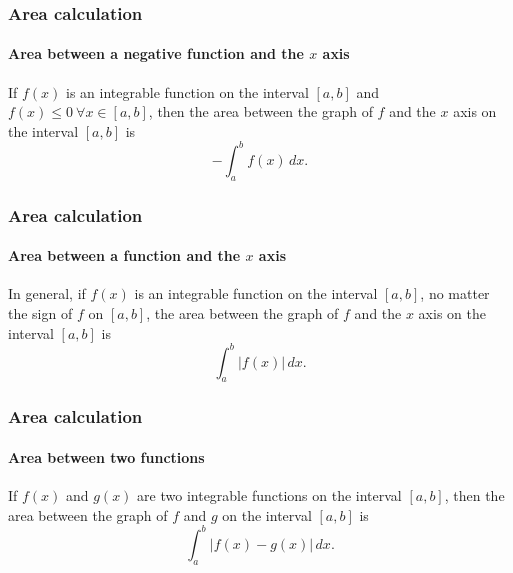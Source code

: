 \begin{frame}
\frametitle{Area calculation}
\framesubtitle{Area between a negative function and the $x$ axis}
If $f(x)$ is an integrable function on the interval $[a,b]$ and $f(x)\leq 0\ \forall x\in[a,b]$, then the area between the graph of $f$ and the $x$ axis on the interval $[a,b]$ is
\[
-\int_a^b f(x)\,dx.
\]
\begin{center}

\end{center}
\end{frame}


\begin{frame}
\frametitle{Area calculation}
\framesubtitle{Area between a function and the $x$ axis}
In general, if $f(x)$ is an integrable function on the interval $[a,b]$, no matter the sign of $f$ on $[a,b]$, the area between the graph of $f$ and the $x$ axis on the interval $[a,b]$ is
\[
\int_a^b |f(x)|\,dx.
\]
\begin{center}

\end{center}
\end{frame}


\begin{frame}
\frametitle{Area calculation}
\framesubtitle{Area between two functions}
If $f(x)$ and $g(x)$ are two integrable functions on the interval $[a,b]$, then the area between the graph of $f$ and $g$ on the interval $[a,b]$ is
\[
\int_{a}^{b}{|f(x)- g(x)|\,dx}.
\]

\begin{center}

\end{center}
\end{frame}